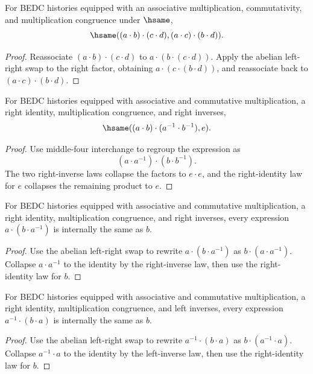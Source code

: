 \begin{theorem}
\label{thm:abgroup-middle-four-interchange}
For BEDC histories equipped with an associative multiplication, commutativity,
and multiplication congruence under \(\hsame\),
$$
\hsame((a\cdot b)\cdot(c\cdot d),(a\cdot c)\cdot(b\cdot d)).
$$
\end{theorem}
\begin{proof}
Reassociate \((a\cdot b)\cdot(c\cdot d)\) to
\(a\cdot(b\cdot(c\cdot d))\). Apply the abelian left-right swap to the right
factor, obtaining \(a\cdot(c\cdot(b\cdot d))\), and reassociate back to
\((a\cdot c)\cdot(b\cdot d)\).
\end{proof}

\begin{theorem}
\label{thm:abgroup-mul-inverse-pair-collapse}
For BEDC histories equipped with associative and commutative multiplication,
a right identity, multiplication congruence, and right inverses,
$$
\hsame((a\cdot b)\cdot(a^{-1}\cdot b^{-1}),e).
$$
\end{theorem}
\begin{proof}
Use middle-four interchange to regroup the expression as
$$
(a\cdot a^{-1})\cdot(b\cdot b^{-1}).
$$
The two right-inverse laws collapse
the factors to $e\cdot e$, and the right-identity law for $e$ collapses
the remaining product to $e$.
\end{proof}

\begin{theorem}
\label{thm:abgroup-conjugation-collapse}
For BEDC histories equipped with associative and commutative multiplication,
a right identity, multiplication congruence, and right inverses, every
expression $a\cdot(b\cdot a^{-1})$ is internally the same as $b$.
\end{theorem}
\begin{proof}
Use the abelian left-right swap to rewrite $a\cdot(b\cdot a^{-1})$ as
$b\cdot(a\cdot a^{-1})$. Collapse $a\cdot a^{-1}$ to the identity by the
right-inverse law, then use the right-identity law for $b$.
\end{proof}

\begin{theorem}
\label{thm:abgroup-inverse-conjugation-collapse}
For BEDC histories equipped with associative and commutative multiplication,
a right identity, multiplication congruence, and left inverses, every
expression $a^{-1}\cdot(b\cdot a)$ is internally the same as $b$.
\end{theorem}
\begin{proof}
Use the abelian left-right swap to rewrite $a^{-1}\cdot(b\cdot a)$ as
$b\cdot(a^{-1}\cdot a)$. Collapse $a^{-1}\cdot a$ to the identity by the
left-inverse law, then use the right-identity law for $b$.
\end{proof}

